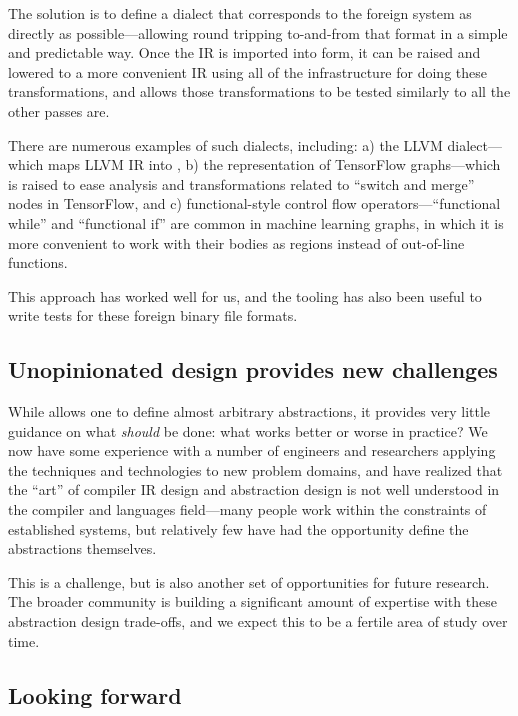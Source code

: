The solution is to define a dialect that corresponds to the foreign system as
directly as possible---allowing round tripping to-and-from that format in a simple
and predictable way. Once the IR is imported into \MLIR form, it can be raised
and lowered to a more convenient IR using all of the \MLIR infrastructure for doing
these transformations, and allows those transformations to be tested similarly
to all the other \MLIR passes are.

There are numerous examples of such dialects, including: a) the LLVM dialect---which
maps LLVM IR into \MLIR, b) the representation of TensorFlow graphs---which
is raised to ease analysis and transformations related to ``switch and merge''
nodes in TensorFlow, and c) functional-style control flow operators---``functional
while'' and ``functional if'' are common in machine learning graphs, in which it is
more convenient to work with their bodies as regions instead of out-of-line
functions.

This approach has worked well for us, and the \MLIR tooling has also been useful
to write tests for these foreign binary file formats.

\subsection{Unopinionated design provides new challenges}

While \MLIR allows one to define almost arbitrary abstractions, it provides very
little guidance on what \emph{should} be done: what works better or worse in
practice? We now have some experience with a number of engineers and researchers
applying the techniques and technologies to new problem domains, and have
realized that the ``art'' of compiler IR design and abstraction design is not
well understood in the compiler and languages field---many people work within
the constraints of established systems, but relatively few have had the
opportunity define the abstractions themselves.

This is a challenge, but is also another set of opportunities for future research.
The broader \MLIR community is building a significant amount of expertise with these
abstraction design trade-offs, and we expect this to be a fertile area of study over
time.

\subsection{Looking forward}

